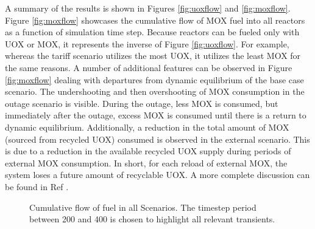 A summary of the results is shown in Figures \ref{fig:uoxflow} and
\ref{fig:moxflow}.  Figure \ref{fig:moxflow} showcases the cumulative flow of
MOX fuel into all reactors as a function of simulation time step. Because
reactors can be fueled only with UOX or MOX, it represents the inverse of
Figure \ref{fig:uoxflow}. For example, whereas the tariff scenario utilizes
the most UOX, it utilizes the least MOX for the same reasons. A number of
additional features can be observed in Figure \ref{fig:moxflow} dealing with
departures from dynamic equilibrium of the base case scenario. The
undershooting and then overshooting of MOX consumption in the outage scenario
is visible. During the outage, less MOX is consumed, but immediately after the
outage, excess MOX is consumed until there is a return to dynamic
equilibrium. Additionally, a reduction in the total amount of MOX (sourced
from recycled UOX) consumed is observed in the external scenario. This is due
to a reduction in the available recycled UOX supply during periods of external
MOX consumption. In short, for each reload of external MOX, the system loses a
future amount of recyclable UOX.  A more complete discussion can be found in
Ref .

\begin{figure}
  \centering
  \begin{minipage}{\textwidth}
    \centering
  \end{minipage}%
  \caption[]{
    \label{fig:flows}
    Cumulative flow of fuel in all Scenarios. The timestep period between 200
    and 400 is chosen to highlight all relevant transients. }
\end{figure}



